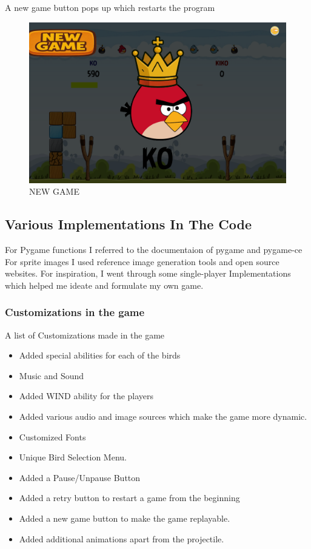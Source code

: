\documentclass{article}
\begin{document}
A new game button pops up which restarts the program
\begin{figure}[h!]
    \centering
    \includegraphics[width = \textwidth]{newgame.png}
    \caption{NEW GAME}
    \label{fig:NEW_GAME}
\end{figure}

\subsection{Various Implementations In The Code}

For Pygame functions I referred to the documentaion of 
pygame\cite{pygameDoc} and pygame-ce\cite{pygameCEDoc}
For sprite images I used reference image generation tools and open
source websites\cite{ImagesAndBGs}.
For inspiration, I went through some single-player Implementations
which helped me ideate and formulate my own game.\cite{ReferenceProjects}

\subsubsection{Customizations in the game}
A list of Customizations made in the game
\begin{itemize}
    \item Added special abilities for each of the birds
    \item Music and Sound
    \item Added WIND ability for the players
    \item Added various audio and image sources which make the game more dynamic.
    \item Customized Fonts
    \item Unique Bird Selection Menu.
    \item Added a Pause/Unpause Button 
    \item Added a retry button to restart a game from the beginning
    \item Added a new game button to make the game replayable.
    \item Added additional animations apart from the projectile.
\end{itemize}
\end{document}
